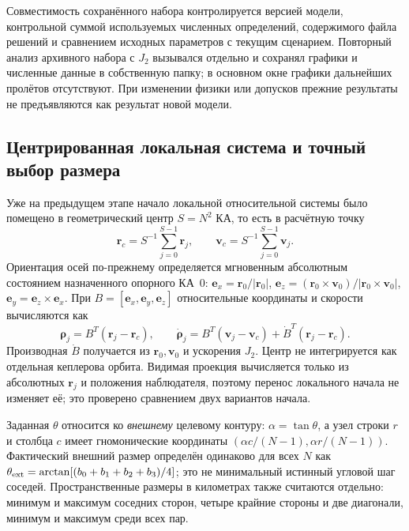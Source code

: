 \documentclass[a4paper,12pt]{article}
\begin{document}
Совместимость сохранённого набора контролируется версией модели,
контрольной суммой используемых численных определений, содержимого
файла решений и сравнением исходных параметров с текущим сценарием.
Повторный анализ архивного набора с $J_2$ вызывался отдельно и сохранял
графики и численные данные в собственную папку;
в основном окне графики дальнейших пролётов отсутствуют. При
изменении физики или допусков прежние результаты не предъявляются
как результат новой модели.

\subsection{Центрированная локальная система и точный выбор размера}

Уже на предыдущем этапе начало локальной относительной системы было помещено в
геометрический центр $S=N^2$ КА, то есть в расчётную точку
\begin{equation}
 \mathbf r_c=S^{-1}\sum_{j=0}^{S-1}\mathbf r_j,\qquad
 \mathbf v_c=S^{-1}\sum_{j=0}^{S-1}\mathbf v_j.
\end{equation}
Ориентация осей по-прежнему определяется мгновенным абсолютным
состоянием назначенного опорного КА~0:
$\mathbf e_x=\mathbf r_0/|\mathbf r_0|$,
$\mathbf e_z=(\mathbf r_0\times\mathbf v_0)/|\mathbf r_0\times\mathbf v_0|$,
$\mathbf e_y=\mathbf e_z\times\mathbf e_x$. При
$B=[\mathbf e_x,\mathbf e_y,\mathbf e_z]$ относительные координаты
и скорости вычисляются как
\begin{equation}
 \boldsymbol\rho_j=B^T(\mathbf r_j-\mathbf r_c),\qquad
 \dot{\boldsymbol\rho}_j=B^T(\mathbf v_j-\mathbf v_c)
       +\dot B^T(\mathbf r_j-\mathbf r_c).
\end{equation}
Производная $\dot B$ получается из $\mathbf r_0,\mathbf v_0$ и
ускорения $J_2$. Центр не интегрируется как отдельная кеплерова
орбита. Видимая проекция вычисляется только из абсолютных
$\mathbf r_j$ и положения наблюдателя, поэтому перенос локального
начала не изменяет её; это проверено сравнением двух вариантов начала.

Заданная $\theta$ относится ко \emph{внешнему} целевому контуру:
$\alpha=\tan\theta$, а узел строки $r$ и столбца $c$ имеет
гномонические координаты $(\alpha c/(N-1),\alpha r/(N-1))$.
Фактический внешний размер определён одинаково для всех $N$ как
$\theta_{\rm ext}=\arctan[(b_0+b_1+b_2+b_3)/4]$; это не
минимальный истинный угловой шаг соседей. Пространственные размеры
в километрах также считаются отдельно: минимум и максимум соседних
сторон, четыре крайние стороны и две диагонали, минимум и максимум
среди всех пар.
\end{document}
